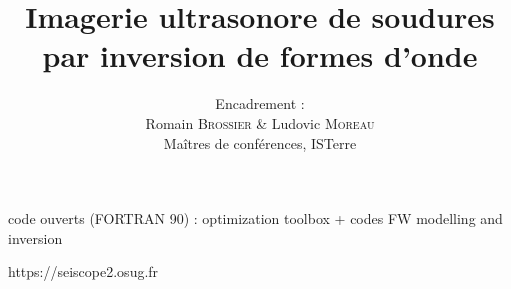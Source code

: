 \documentclass[11pt,xcolor=x11names,compress, notes=show]{beamer}%
\author{Encadrement : \\ Romain \textsc{Brossier} \& Ludovic \textsc{Moreau} \\ Maîtres de conférences, ISTerre}
\title{Imagerie ultrasonore de soudures\\par inversion de formes d'onde}
\begin{document}
%





\begin{frame}
code ouverts (FORTRAN 90) : optimization toolbox + codes FW modelling and inversion

 https://seiscope2.osug.fr
\end{frame}
\end{document}
